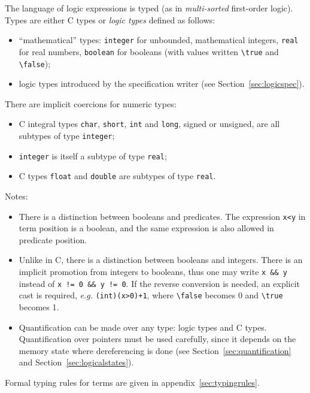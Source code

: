 The language of logic expressions is typed (as in \emph{multi-sorted}
first-order logic). Types are either C types or \emph{logic types}
defined as follows:
\begin{itemize}
\item ``mathematical'' types: \lstinline|integer| for
  unbounded, mathematical integers, \lstinline|real| for
  real numbers, \lstinline|boolean| for booleans (with
  values written \lstinline|\true| and
  \lstinline|\false|);
\item logic types introduced by the specification writer (see
  Section~\ref{sec:logicspec}).
\end{itemize}
There are implicit coercions for numeric types:
\begin{itemize}
\item C integral types \lstinline|char|, \lstinline|short|, \lstinline|int| and
  \lstinline|long|, signed or unsigned, are all subtypes of type
\lstinline|integer|;
\item \lstinline|integer| is itself a subtype of type \lstinline|real|;
\item C types \lstinline|float| and \lstinline|double| are subtypes of
  type \lstinline|real|.
\end{itemize}
Notes:
\begin{itemize}
\item There is a distinction between booleans and predicates. The
  expression \lstinline|x<y| in term position is a boolean, and the
  same expression
  is also allowed in predicate position.
\item Unlike in C, there is a distinction between booleans and
  integers. There is an implicit promotion from integers to booleans,
  thus one may write \lstinline|x && y| instead of \lstinline|x != 0 && y != 0|.
  If the reverse conversion is needed, an explicit cast is
  required, \emph{e.g.} \lstinline|(int)(x>0)+1|, where
  \lstinline|\false| becomes 0
  and \lstinline|\true| becomes 1.
\item Quantification can be made over any type: logic types and C
  types. Quantification over pointers must be used carefully,
  since it depends on the memory state where dereferencing is done (see
  Section~\ref{sec:quantification} and
  Section~\ref{sec:logicalstates}).
\end{itemize}

Formal typing rules for terms are given in appendix~\ref{sec:typingrules}.


